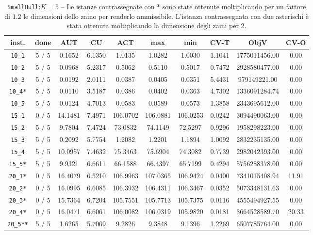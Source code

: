 \begin{table}[h!]
\begin{center}
\small
\begin{tabular}{| c | c | c | c | c | c | c | c | c | c |}
\hline
inst. & done & AUT & CU & ACT & max & min & CV-T & ObjV & CV-O \\
\hline
\verb|10_1| & 5 / 5 & 0.1652 & 6.1350 & 1.0135 & 1.0282 & 1.0030 & 1.1041 & 1775011456.00 & 0.00\\ 
\verb|10_2| & 5 / 5 & 0.0968 & 5.2317 & 0.5062 & 0.5110 & 0.5017 & 0.7472 & 2928580477.00 & 0.00\\ 
\verb|10_3| & 5 / 5 & 0.0192 & 2.0111 & 0.0387 & 0.0405 & 0.0351 & 5.4431 & 979149221.00 & 0.00\\ 
\verb|10_4*| & 5 / 5 & 0.0110 & 3.5187 & 0.0386 & 0.0402 & 0.0363 & 4.7302 & 1336091284.74 & 0.00\\ 
\verb|10_5| & 5 / 5 & 0.0124 & 4.7013 & 0.0583 & 0.0589 & 0.0573 & 1.3858 & 2343695612.00 & 0.00\\ 
\verb|15_1| & 0 / 5 & 14.1481 & 7.4971 & 106.0702 & 106.0881 & 106.0253 & 0.0242 & 3094490063.00 & 0.00\\ 
\verb|15_2| & 5 / 5 & 9.7804 & 7.4724 & 73.0832 & 74.1149 & 72.5297 & 0.9296 & 1958298223.00 & 0.00\\ 
\verb|15_3| & 5 / 5 & 0.2092 & 5.7754 & 1.2082 & 1.2201 & 1.1894 & 1.0092 & 2832235135.00 & 0.00\\ 
\verb|15_4| & 5 / 5 & 10.0957 & 7.4632 & 75.3463 & 75.6904 & 74.3082 & 0.7739 & 2982042393.00 & 0.00\\ 
\verb|15_5*| & 5 / 5 & 9.9321 & 6.6611 & 66.1588 & 66.4397 & 65.7199 & 0.4294 & 5756288378.00 & 0.00\\ 
\verb|20_1*| & 0 / 5 & 16.4079 & 6.5210 & 106.9963 & 107.0365 & 106.9424 & 0.0400 & 7341015408.94 & 11.91\\ 
\verb|20_2*| & 0 / 5 & 16.0995 & 6.6085 & 106.3932 & 106.4311 & 106.3467 & 0.0352 & 5073348131.63 & 0.00\\ 
\verb|20_3*| & 0 / 5 & 15.7364 & 6.7204 & 105.7551 & 105.7713 & 105.7375 & 0.0116 & 4555494927.55 & 0.00\\ 
\verb|20_4*| & 0 / 5 & 16.0471 & 6.6061 & 106.0082 & 106.0319 & 105.9820 & 0.0181 & 3664528589.70 & 20.33\\ 
\verb|20_5**| & 5 / 5 & 1.6265 & 5.7069 & 9.2826 & 9.3848 & 9.1396 & 1.2269 & 6507785764.00 & 0.00\\ 
\hline
\end{tabular}
\caption{\texttt{SmallHull}:$K=5$ -- Le istanze contrassegnate con * sono state ottenute
moltiplicando per un fattore di $1.2$ le dimensioni dello zaino per renderlo ammissibile.
L'istanza contrassegnata con due asterischi è stata ottenuta moltiplicando la dimensione
degli zaini per $2$.}
\label{table:hull:5}
\end{center}
\end{table}


